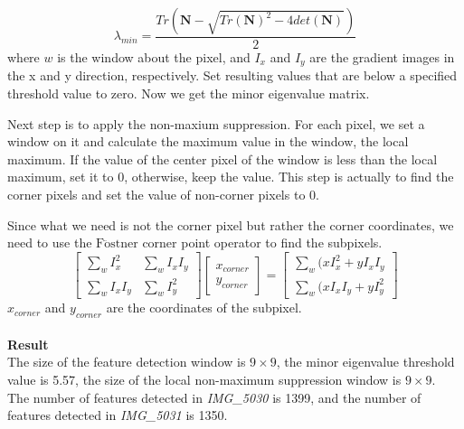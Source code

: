 \documentclass{../../assignment}
\begin{document}
\begin{problemlist}
\begin{enumerate}
$$\lambda_{min} = \frac{Tr(\mathbf{N} - \sqrt{Tr(\mathbf{N})^2 - 4det(\mathbf{N})})}{2}$$
where $w$ is the window about the pixel, and $I_x$ and $I_y$ are the gradient images in the x and y direction, respectively. Set resulting values that are below a specified threshold value to zero. Now we get the minor eigenvalue matrix.

Next step is to apply the non-maxium suppression. For each pixel, we set a window on it and calculate the maximum value in the window, the local maximum. If the value of the center pixel of the window is less than the local maximum, set it to 0, otherwise, keep the value. This step is actually to find the corner pixels and set the value of non-corner pixels to 0.

Since what we need is not the corner pixel but rather the corner coordinates, we need to use the $\mathrm{F\ddot{o}stner}$ corner point operator to find the subpixels.
\[
\begin{bmatrix}
\sum_w I_x^2 &  \sum_w I_x I_y\\
\sum_w I_x I_y & \sum_w I_y^2
\end{bmatrix}
\begin{bmatrix}
x_{corner}\\
y_{corner}
\end{bmatrix}
=
\begin{bmatrix}
\sum_w (x I_x^2 + y I_x I_y\\
\sum_w (x I_x I_y + y I_y^2
\end{bmatrix}
\]
$x_{corner}$ and $y_{corner}$ are the coordinates of the subpixel.
\\\\
\textbf{Result}\\
The size of the feature detection window is $9\times9$, 
the minor eigenvalue threshold value is 5.57, 
the size of the local non-maximum suppression window is $9\times9$.\\
The number of features detected in \emph{IMG\_5030} is 1399, and the number of features detected in \emph{IMG\_5031
} is 1350.
\begin{figure}[H]
\end{figure}
\end{enumerate}
\end{problemlist}
\end{document}
